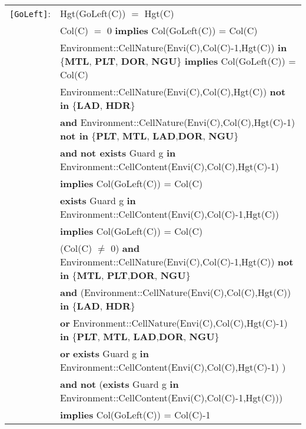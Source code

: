 \documentclass[7pt]{article}
\begin{document}
\begin{tabular}{rl}


\texttt{[GoLeft]}: & \textrm{Hgt(GoLeft(C))} $=$ \textrm{Hgt(C)} \\
& \textrm{Col(C)} $=$ 0 \textbf{implies} \textrm{Col(GoLeft(C))} = \textrm{Col(C)} \\
& \textrm{Environment::CellNature(Envi(C),Col(C)-1,Hgt(C))} \textbf{in} \{\textbf{MTL}, \textbf{PLT}, \textbf{DOR}, \textbf{NGU}\} \textbf{implies} \textrm{Col(GoLeft(C))} = \textrm{Col(C)} \\
& \textrm{Environment::CellNature(Envi(C),Col(C),Hgt(C))} \textbf{not in} \{\textbf{LAD}, \textbf{HDR}\}
\\ & \quad\quad \textbf{and} \textrm{Environment::CellNature(Envi(C),Col(C),Hgt(C)-1)} \textbf{not in} \{\textbf{PLT}, \textbf{MTL}, \textbf{LAD},\textbf{DOR}, \textbf{NGU}\} \\
& \quad\quad \textbf{and} \textbf{not exists} \textrm{Guard} g \textbf{in} \textrm{Environment::CellContent(Envi(C),Col(C),Hgt(C)-1)} \\
& \quad\quad \textbf{implies} \textrm{Col(GoLeft(C))} = \textrm{Col(C)} \\
& \textbf{exists} \textrm{Guard} g \textbf{in} \textrm{Environment::CellContent(Envi(C),Col(C)-1,Hgt(C))} \\ & \quad\quad \textbf{implies} \textrm{Col(GoLeft(C))} = \textrm{Col(C)} \\
& (\textrm{Col(C)} $\neq$ 0) \textbf{and} \textrm{Environment::CellNature(Envi(C),Col(C)-1,Hgt(C))} \textbf{not in} \{\textbf{MTL}, \textbf{PLT},\textbf{DOR}, \textbf{NGU}\} \\
& \quad\quad \textbf{and} (\textrm{Environment::CellNature(Envi(C),Col(C),Hgt(C))} \textbf{in} \{\textbf{LAD}, \textbf{HDR}\} \\
& \quad\quad\quad\quad \textbf{or} \textrm{Environment::CellNature(Envi(C),Col(C),Hgt(C)-1)} \textbf{in} \{\textbf{PLT}, \textbf{MTL}, \textbf{LAD},\textbf{DOR}, \textbf{NGU}\} \\
& \quad\quad\quad\quad \textbf{or} \textbf{exists} \textrm{Guard} g \textbf{in} \textrm{Environment::CellContent(Envi(C),Col(C),Hgt(C)-1)} ) \\
& \quad\quad \textbf{and} \textbf{not} (\textbf{exists} \textrm{Guard} g \textbf{in} \textrm{Environment::CellContent(Envi(C),Col(C)-1,Hgt(C))}) \\
& \quad\quad \textbf{implies} \textrm{Col(GoLeft(C))} = \textrm{Col(C)}-1 \\


\end{tabular}
\end{document}

